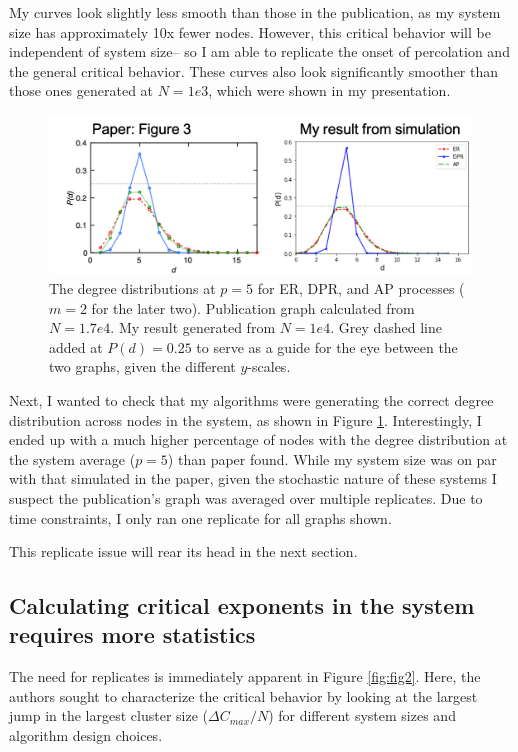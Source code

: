 \documentclass[11pt]{article}   	%
\begin{document}
My curves look slightly less smooth than those in the publication, as my system size has approximately 10x fewer nodes. However, this critical behavior will be independent of system size-- so I am able to replicate the onset of percolation and the general critical behavior. These curves also look significantly smoother than those ones generated at $N=1e3$, which were shown in my presentation.

\begin{figure}[t]
\begin{center}
\includegraphics[width=\textwidth]{fig/fig3_comparison.png}
\caption{The degree distributions at $p=5$ for ER, DPR, and AP processes ($m=2$ for the later two). Publication graph calculated from $N=1.7e4$. My result generated from $N=1e4$. Grey dashed line added at $P(d)=0.25$ to serve as a guide for the eye between the two graphs, given the different $y$-scales.}
\label{fig:fig3}
\end{center}
\end{figure}

Next, I wanted to check that my algorithms were generating the correct degree distribution across nodes in the system, as shown in Figure \ref{fig:fig3}. Interestingly, I ended up with a much higher percentage of nodes with the degree distribution at the system average ($p=5$) than paper found. While my system size was on par with that simulated in the paper, given the stochastic nature of these systems I suspect the publication's graph was averaged over multiple replicates. Due to time constraints, I only ran one replicate for all graphs shown.

This replicate issue will rear its head in the next section.


\subsection{Calculating critical exponents in the system requires more statistics}

The need for replicates is immediately apparent in Figure \ref{fig:fig2}. Here, the authors sought to characterize the critical behavior by looking at the largest jump in the largest cluster size ($\Delta C_{max}/N$) for different system sizes and algorithm design choices.
\end{document}
